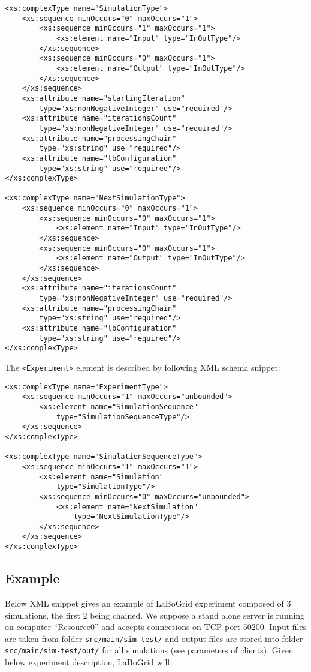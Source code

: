 \begin{Verbatim}[tabsize=2,frame=lines]
<xs:complexType name="SimulationType">
	<xs:sequence minOccurs="0" maxOccurs="1">
		<xs:sequence minOccurs="1" maxOccurs="1">
			<xs:element name="Input" type="InOutType"/>
		</xs:sequence>
		<xs:sequence minOccurs="0" maxOccurs="1">
			<xs:element name="Output" type="InOutType"/>
		</xs:sequence>
	</xs:sequence>
	<xs:attribute name="startingIteration"
		type="xs:nonNegativeInteger" use="required"/>
	<xs:attribute name="iterationsCount"
		type="xs:nonNegativeInteger" use="required"/>
	<xs:attribute name="processingChain"
		type="xs:string" use="required"/>
	<xs:attribute name="lbConfiguration"
		type="xs:string" use="required"/>
</xs:complexType>

<xs:complexType name="NextSimulationType">
	<xs:sequence minOccurs="0" maxOccurs="1">
		<xs:sequence minOccurs="0" maxOccurs="1">
			<xs:element name="Input" type="InOutType"/>
		</xs:sequence>
		<xs:sequence minOccurs="0" maxOccurs="1">
			<xs:element name="Output" type="InOutType"/>
		</xs:sequence>
	</xs:sequence>
	<xs:attribute name="iterationsCount"
		type="xs:nonNegativeInteger" use="required"/>
	<xs:attribute name="processingChain"
		type="xs:string" use="required"/>
	<xs:attribute name="lbConfiguration"
		type="xs:string" use="required"/>
</xs:complexType>
\end{Verbatim}

The \verb|<Experiment>| element is described by following XML schema snippet:

\begin{Verbatim}[tabsize=2,frame=lines]
<xs:complexType name="ExperimentType">
	<xs:sequence minOccurs="1" maxOccurs="unbounded">
		<xs:element name="SimulationSequence"
			type="SimulationSequenceType"/>
	</xs:sequence>
</xs:complexType>

<xs:complexType name="SimulationSequenceType">
	<xs:sequence minOccurs="1" maxOccurs="1">
		<xs:element name="Simulation"
			type="SimulationType"/>
		<xs:sequence minOccurs="0" maxOccurs="unbounded">
			<xs:element name="NextSimulation"
				type="NextSimulationType"/>
		</xs:sequence>
	</xs:sequence>
</xs:complexType>
\end{Verbatim}


\subsection{Example}

Below XML snippet gives an example of LaBoGrid experiment composed of 3
simulations, the first 2 being chained. We suppose a stand alone server is
running on computer ``Resource0'' and accepts connections on TCP port 50200.
Input files are taken from folder \verb|src/main/sim-test/| and output files
are stored into folder \texttt{src/main/sim-\linebreak[1]{}test/out/} for all
simulations (see parameters of clients). Given
below experiment description, LaBoGrid will:

